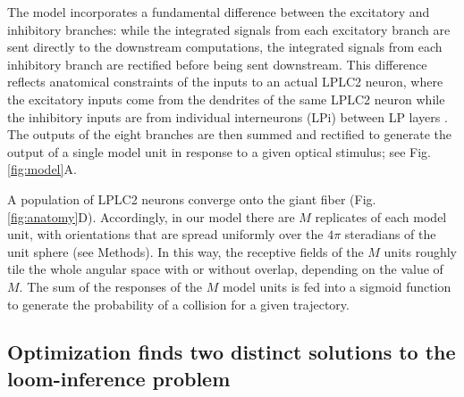 \documentclass[pdftex,9pt,lineno]{elife}
\begin{document}
The model incorporates a fundamental difference between the excitatory and inhibitory branches: while the integrated signals from each excitatory branch are sent directly to the downstream computations, the integrated signals from each inhibitory branch are rectified before being sent downstream. This difference reflects anatomical constraints of the inputs to an actual LPLC2 neuron, where the excitatory inputs come from the dendrites of the same LPLC2 neuron while the inhibitory inputs are from individual interneurons (LPi) between LP layers \citep{mauss2015neural,klapoetke2017ultra}. The outputs of the eight branches are then summed and rectified to generate the output of a single model unit in response to a given optical stimulus; see Fig. \ref{fig:model}A.

A population of LPLC2 neurons converge onto the giant fiber (Fig. \ref{fig:anatomy}D). Accordingly, in our model there are $M$ replicates of each model unit, with orientations that are spread uniformly over the $4\pi$ steradians of the unit sphere (see Methods). In this way, the receptive fields of the $M$ units roughly  tile the whole angular space with or without overlap, depending on the value of $M$. The sum of the responses of the $M$ model units is fed into a sigmoid function to generate the probability of a collision for a given trajectory.



\subsection{Optimization finds two distinct solutions to the loom-inference problem}




\end{document}
